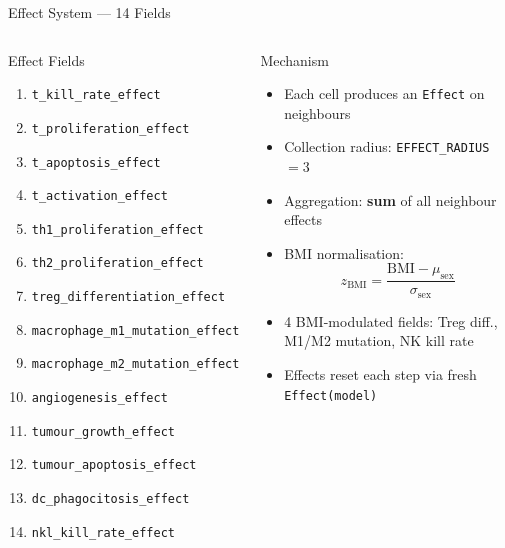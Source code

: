 \documentclass[aspectratio=169,10pt]{beamer}
\begin{document}
\begin{frame}{Effect System --- 14 Fields}
  \begin{columns}[T]
    \begin{block}{Effect Fields}
      \scriptsize
      \begin{enumerate}\setlength\itemsep{0.1em}
        \item \texttt{t\_kill\_rate\_effect}
        \item \texttt{t\_proliferation\_effect}
        \item \texttt{t\_apoptosis\_effect}
        \item \texttt{t\_activation\_effect}
        \item \texttt{th1\_proliferation\_effect}
        \item \texttt{th2\_proliferation\_effect}
        \item \texttt{treg\_differentiation\_effect}
        \item \texttt{macrophage\_m1\_mutation\_effect}
        \item \texttt{macrophage\_m2\_mutation\_effect}
        \item \texttt{angiogenesis\_effect}
        \item \texttt{tumour\_growth\_effect}
        \item \texttt{tumour\_apoptosis\_effect}
        \item \texttt{dc\_phagocitosis\_effect}
        \item \texttt{nkl\_kill\_rate\_effect}
      \end{enumerate}
    \end{block}

    \begin{block}{Mechanism}
      \begin{itemize}
        \item Each cell produces an \texttt{Effect} on neighbours
        \item Collection radius: \texttt{EFFECT\_RADIUS} $= 3$
        \item Aggregation: \textbf{sum} of all neighbour effects
        \item BMI normalisation:
          \[
            z_\text{BMI} = \frac{\text{BMI} - \mu_\text{sex}}{\sigma_\text{sex}}
          \]
        \item 4 BMI-modulated fields: Treg diff., M1/M2 mutation, NK kill rate
        \item Effects reset each step via fresh \texttt{Effect(model)}
      \end{itemize}
    \end{block}
  \end{columns}
\end{frame}
\end{document}
